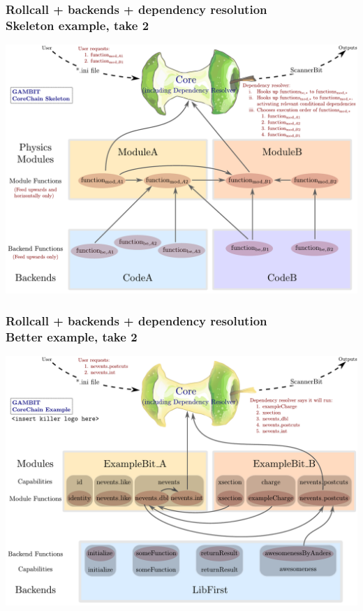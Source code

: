 \documentclass[xcolor=dvipsnames]{beamer}
\begin{document}
\begin{frame}
\frametitle{Rollcall + backends + dependency resolution \\Skeleton example, take 2}
\includegraphics[width=\linewidth]{coreChainDiagram_basic}
\end{frame}


\begin{frame}
\frametitle{Rollcall + backends + dependency resolution \\Better example, take 2}
\includegraphics[width=\linewidth]{coreChainDiagram_example}
\end{frame}
\end{document}
